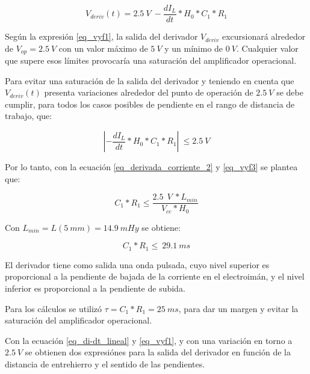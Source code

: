 \begin{equation} \label{eq_vyf1}
	V_{deriv}(t) = 2.5\:V\ -\frac{dI_L}{dt}*H_0*C_1*R_1
\end{equation}

Según la expresión \ref{eq_vyf1}, la salida del derivador $V_{deriv}$ excursionará alrededor de $V_{op}=2.5\:V$ con un valor máximo de $5\:V$ y un mínimo de $0\:V$. Cualquier valor que supere esos límites provocaría una saturación del amplificador operacional.

Para evitar una saturación de la salida del derivador y teniendo en cuenta que $V_{deriv}(t)$ presenta variaciones alrededor del punto de operación de $2.5\:V$ se debe cumplir, para todos los casos posibles de pendiente en el rango de distancia de trabajo, que:

\begin{equation} \label{eq_vyf3}
	\left|-\frac{dI_L}{dt}*H_0*C_1*R_1\right|\ \le 2.5\:V
\end{equation}

Por lo tanto, con la ecuación \ref{eq_derivada_corriente_2} y \ref{eq_vyf3} se plantea que:

\begin{equation} \label{eq_condicionC1-R1}
	C_1*R_1\le\frac{2.5\ \:V\ *L_{min}}{V_{cc}*H_0}
\end{equation}

Con $L_{min}= L(5\: mm) = 14.9\: mHy$ se obtiene: 

\begin{equation} \label{eq_condicionC1-R1-2}
	C_1*R_1\le\ 29.1\ ms
\end{equation}

El derivador tiene como salida una onda pulsada, cuyo nivel superior es proporcional a la pendiente de bajada de la corriente en el electroimán, y el nivel inferior es proporcional a la pendiente de subida.

Para los cálculos se utilizó $\tau = C_1*R_1= 25\:ms$, para dar un margen y evitar la saturación del amplificador operacional.  

Con la ecuación \ref{eq_di-dt_lineal} y \ref{eq_vyf1}, y con una variación en torno a $2.5\:V$ se obtienen dos expresiónes para la salida del derivador en función de la distancia de entrehierro y el sentido de las pendientes.



